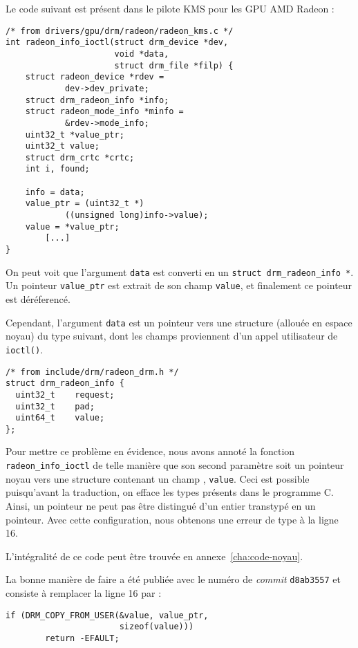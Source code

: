 Le code suivant est présent dans le pilote KMS pour les GPU AMD Radeon :

\begin{verbatim}
/* from drivers/gpu/drm/radeon/radeon_kms.c */
int radeon_info_ioctl(struct drm_device *dev,
                      void *data,
                      struct drm_file *filp) {
	struct radeon_device *rdev =
            dev->dev_private;
	struct drm_radeon_info *info;
	struct radeon_mode_info *minfo =
            &rdev->mode_info;
	uint32_t *value_ptr;
	uint32_t value;
	struct drm_crtc *crtc;
	int i, found;

	info = data;
	value_ptr = (uint32_t *)
            ((unsigned long)info->value);
	value = *value_ptr;
        [...]
}
\end{verbatim}

On peut voit que l'argument \texttt{data} est converti en un \texttt{struct
drm\_radeon\_info *}. Un pointeur \texttt{value\_ptr} est extrait de son champ
\texttt{value}, et finalement ce pointeur est déréferencé.

Cependant, l'argument \texttt{data} est un pointeur vers une structure (allouée
en espace noyau) du type suivant, dont les champs proviennent d'un appel
utilisateur de \texttt{ioctl()}.

\begin{verbatim}
/* from include/drm/radeon_drm.h */
struct drm_radeon_info {
  uint32_t    request;
  uint32_t    pad;
  uint64_t    value;
};
\end{verbatim}

Pour mettre ce problème en évidence, nous avons annoté la fonction
\texttt{radeon\_info\_ioctl} de telle manière que son second paramètre soit un
pointeur noyau vers une structure contenant un champ \qUser, \texttt{value}.
Ceci est possible puisqu'avant la traduction, on efface les types présents dans
le programme C. Ainsi, un pointeur ne peut pas être distingué d'un entier
transtypé en un pointeur. Avec cette configuration, nous obtenons une erreur de
type à la ligne 16.

L'intégralité de ce code peut être trouvée en annexe~\ref{cha:code-noyau}.

La bonne manière de faire a été publiée avec le numéro de \emph{commit}
\texttt{d8ab3557} et consiste à remplacer la ligne 16 par :

\begin{verbatim}
if (DRM_COPY_FROM_USER(&value, value_ptr,
                       sizeof(value)))
        return -EFAULT;
\end{verbatim}

